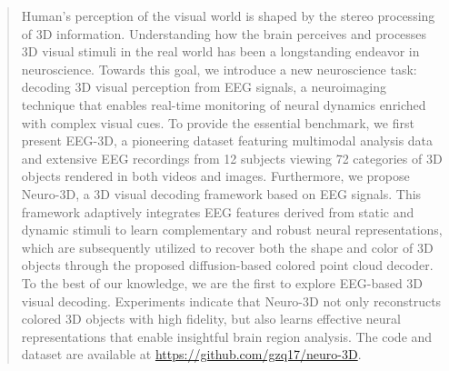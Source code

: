 \begin{abstract} 
	Human's perception of the visual world is shaped by the stereo processing of 3D information.
	Understanding how the brain perceives and processes 3D visual stimuli in the real world has been a longstanding endeavor in neuroscience. 
	Towards this goal, we introduce a new neuroscience task: decoding 3D visual perception from EEG signals, a neuroimaging technique that enables real-time monitoring of neural dynamics enriched with complex visual cues.
	To provide the essential benchmark, we first present EEG-3D, a pioneering dataset featuring multimodal analysis data and extensive EEG recordings from 12 subjects viewing 72 categories of 3D objects rendered in both videos and images.
	Furthermore, we propose Neuro-3D, a 3D visual decoding framework based on EEG signals. This framework adaptively integrates EEG features derived from static and dynamic stimuli to learn complementary and robust neural representations, which are subsequently utilized to recover both the shape and color of 3D objects through the proposed diffusion-based colored point cloud decoder.
	To the best of our knowledge, we are the first to explore EEG-based 3D visual decoding. Experiments indicate that Neuro-3D not only reconstructs colored 3D objects with high fidelity,  but also learns effective neural representations that enable insightful brain region analysis. The code and dataset are available at \url{https://github.com/gzq17/neuro-3D}.
	
\end{abstract}